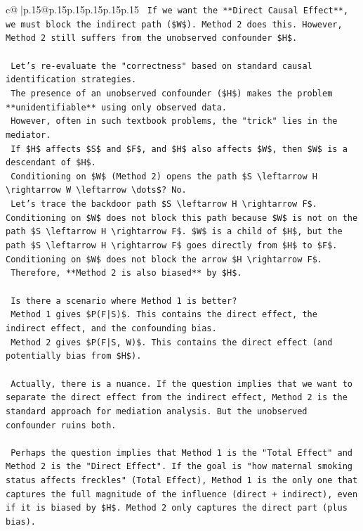 \documentclass{article}
\begin{document}
{\begin{supertabular}{c@{$\;$}|p{.15\linewidth}@{}p{.15\linewidth}p{.15\linewidth}p{.15\linewidth}p{.15\linewidth}p{.15\linewidth}}
{{{\texttt{    If we want the **Direct Causal Effect**, we must block the indirect path (\$W\$). Method 2 does this. However, Method 2 still suffers from the unobserved confounder \$H\$.} \\
\\ 
\texttt{    Let's re{-}evaluate the "correctness" based on standard causal identification strategies.} \\
\texttt{    The presence of an unobserved confounder (\$H\$) makes the problem **unidentifiable** using only observed data.} \\
\texttt{    However, often in such textbook problems, the "trick" lies in the mediator.} \\
\texttt{    If \$H\$ affects \$S\$ and \$F\$, and \$H\$ also affects \$W\$, then \$W\$ is a descendant of \$H\$.} \\
\texttt{    Conditioning on \$W\$ (Method 2) opens the path \$S \textbackslash{}leftarrow H \textbackslash{}rightarrow W \textbackslash{}leftarrow \textbackslash{}dots\$? No.} \\
\texttt{    Let's trace the backdoor path \$S \textbackslash{}leftarrow H \textbackslash{}rightarrow F\$. Conditioning on \$W\$ does not block this path because \$W\$ is not on the path \$S \textbackslash{}leftarrow H \textbackslash{}rightarrow F\$. \$W\$ is a child of \$H\$, but the path \$S \textbackslash{}leftarrow H \textbackslash{}rightarrow F\$ goes directly from \$H\$ to \$F\$. Conditioning on \$W\$ does not block the arrow \$H \textbackslash{}rightarrow F\$.} \\
\texttt{    Therefore, **Method 2 is also biased** by \$H\$.} \\
\\ 
\texttt{    Is there a scenario where Method 1 is better?} \\
\texttt{    Method 1 gives \$P(F|S)\$. This contains the direct effect, the indirect effect, and the confounding bias.} \\
\texttt{    Method 2 gives \$P(F|S, W)\$. This contains the direct effect (and potentially bias from \$H\$).} \\
\\ 
\texttt{    Actually, there is a nuance. If the question implies that we want to separate the direct effect from the indirect effect, Method 2 is the standard approach for mediation analysis. But the unobserved confounder ruins both.} \\
\\ 
\texttt{    Perhaps the question implies that Method 1 is the "Total Effect" and Method 2 is the "Direct Effect". If the goal is "how maternal smoking status affects freckles" (Total Effect), Method 1 is the only one that captures the full magnitude of the influence (direct + indirect), even if it is biased by \$H\$. Method 2 only captures the direct part (plus bias).} \\
}}}
\end{supertabular}}
\end{document}
